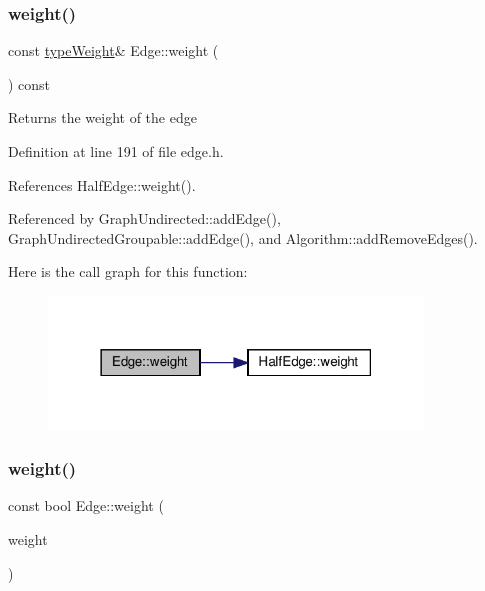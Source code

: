 \subsubsection{\texorpdfstring{weight()}{weight()}\hspace{0.1cm}{\footnotesize\ttfamily [1/2]}}
{\footnotesize\ttfamily const \hyperlink{edge_8h_a2e7ea3be891ac8b52f749ec73fee6dd2}{type\+Weight}\& Edge\+::weight (\begin{DoxyParamCaption}{ }\end{DoxyParamCaption}) const\hspace{0.3cm}{\ttfamily [inline]}}

\begin{DoxyReturn}{Returns}
the weight of the edge 
\end{DoxyReturn}


Definition at line 191 of file edge.\+h.



References Half\+Edge\+::weight().



Referenced by Graph\+Undirected\+::add\+Edge(), Graph\+Undirected\+Groupable\+::add\+Edge(), and Algorithm\+::add\+Remove\+Edges().

Here is the call graph for this function\+:
\nopagebreak
\begin{figure}[H]
\begin{center}
\leavevmode
\includegraphics[width=282pt]{classEdge_a9d5634336c89578f1bbbfce20c3938a7_cgraph}
\end{center}
\end{figure}
\mbox{\label{classEdge_abaf02f474e1cdc61f3baf06875b4f38c}} 
\subsubsection{\texorpdfstring{weight()}{weight()}\hspace{0.1cm}{\footnotesize\ttfamily [2/2]}}
{\footnotesize\ttfamily const bool Edge\+::weight (\begin{DoxyParamCaption}\item[{const \hyperlink{edge_8h_a2e7ea3be891ac8b52f749ec73fee6dd2}{type\+Weight} \&}]{weight }\end{DoxyParamCaption})\hspace{0.3cm}{\ttfamily [inline]}}

